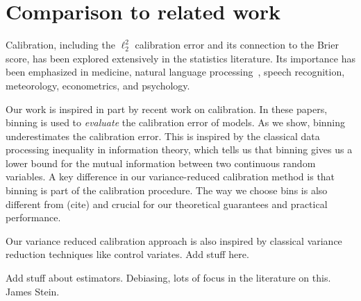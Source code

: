 \section{Comparison to related work}

Calibration, including the $\ell_2^2$ calibration error and its connection to the Brier score, has been explored extensively in the statistics literature. Its importance has been emphasized in medicine, natural language processing~\cite{jiang2012calibrating}, speech recognition, meteorology, econometrics, and psychology.

Our work is inspired in part by recent work on calibration. In these papers, binning is used to \emph{evaluate} the calibration error of models. As we show, binning underestimates the calibration error. This is inspired by the classical data processing inequality in information theory, which tells us that binning gives us a lower bound for the mutual information between two continuous random variables. A key difference in our variance-reduced calibration method is that binning is part of the calibration procedure. The way we choose bins is also different from (cite) and crucial for our theoretical guarantees and practical performance.

Our variance reduced calibration approach is also inspired by classical variance reduction techniques like control variates. Add stuff here.

Add stuff about estimators. Debiasing, lots of focus in the literature on this. James Stein.
